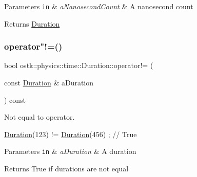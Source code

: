 \begin{DoxyParams}[1]{Parameters}
\mbox{\tt in}  & {\em a\+Nanosecond\+Count} & A nanosecond count \\
\hline
\end{DoxyParams}
\begin{DoxyReturn}{Returns}
\hyperlink{classostk_1_1physics_1_1time_1_1_duration}{Duration} 
\end{DoxyReturn}
\mbox{\label{classostk_1_1physics_1_1time_1_1_duration_a5e99b046bbf8aa1de0f8e212b7794e38}} 
\subsubsection{\texorpdfstring{operator"!=()}{operator!=()}}
{\footnotesize\ttfamily bool ostk\+::physics\+::time\+::\+Duration\+::operator!= (\begin{DoxyParamCaption}\item[{const \hyperlink{classostk_1_1physics_1_1time_1_1_duration}{Duration} \&}]{a\+Duration }\end{DoxyParamCaption}) const}



Not equal to operator. 


\begin{DoxyCode}
\hyperlink{classostk_1_1physics_1_1time_1_1_duration_a6ba3a020742ca6e3bf0b1970dd039c07}{Duration}(123) != \hyperlink{classostk_1_1physics_1_1time_1_1_duration_a6ba3a020742ca6e3bf0b1970dd039c07}{Duration}(456) ; \textcolor{comment}{// True}
\end{DoxyCode}



\begin{DoxyParams}[1]{Parameters}
\mbox{\tt in}  & {\em a\+Duration} & A duration \\
\hline
\end{DoxyParams}
\begin{DoxyReturn}{Returns}
True if durations are not equal 
\end{DoxyReturn}
\mbox{\label{classostk_1_1physics_1_1time_1_1_duration_afca79b9de1ea487b00abdb8be8c5608d}} 
